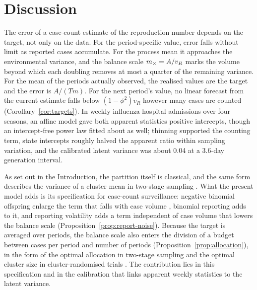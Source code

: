 \section{Discussion}
\label{sec:discussion}

The error of a case-count estimate of the reproduction number depends on the target, not only on the data. For the period-specific value, error falls without limit as reported cases accumulate. For the process mean it approaches the environmental variance, and the balance scale $m_{\times}=A/v_R$ marks the volume beyond which each doubling removes at most a quarter of the remaining variance. For the mean of the periods actually observed, the realised values are the target and the error is $A/(Tm)$. For the next period's value, no linear forecast from the current estimate falls below $(1-\phi^2)v_R$ however many cases are counted (Corollary~\ref{cor:targets}). In weekly influenza hospital admissions over four seasons, an affine model gave both apparent statistics positive intercepts, though an intercept-free power law fitted about as well; thinning supported the counting term, state intercepts roughly halved the apparent ratio within sampling variation, and the calibrated latent variance was about 0.04 at a 3.6-day generation interval.

As set out in the Introduction, the partition itself is classical, and the same form describes the variance of a cluster mean in two-stage sampling \citep{cochran1977sampling}. What the present model adds is its specification for case-count surveillance: negative binomial offspring enlarge the term that falls with case volume \citep{lloydsmith2005superspreading}, binomial reporting adds to it, and reporting volatility adds a term independent of case volume that lowers the balance scale (Proposition~\ref{prop:report-noise}). Because the target is averaged over periods, the balance scale also enters the division of a budget between cases per period and number of periods (Proposition~\ref{prop:allocation}), in the form of the optimal allocation in two-stage sampling and the optimal cluster size in cluster-randomised trials \citep{raudenbush1997statistical}. The contribution lies in this specification and in the calibration that links apparent weekly statistics to the latent variance.

